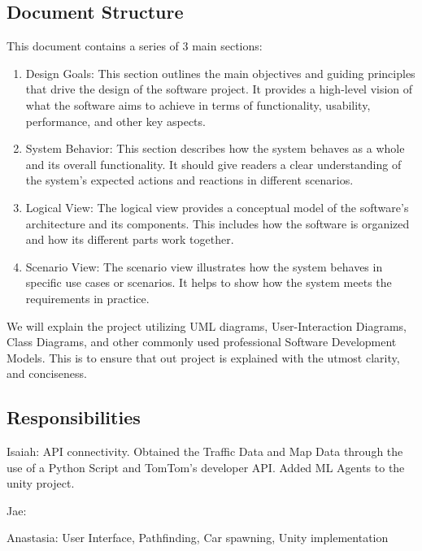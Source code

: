 \subsection{Document Structure}

This document contains a series of 3 main sections:
\begin{enumerate}
    \item Design Goals: This section outlines the main objectives and guiding principles that drive the design of the software project. 
    It provides a high-level vision of what the software aims to achieve in terms of functionality, usability, performance, and other key aspects.
    
    \item System Behavior: This section describes how the system behaves as a whole and its overall functionality. 
    It should give readers a clear understanding of the system's expected actions and reactions in different scenarios.
    
    \item Logical View: The logical view provides a conceptual model of the software's architecture and its components. 
    This includes how the software is organized and how its different parts work together.

    \item Scenario View: The scenario view illustrates how the system behaves in specific use cases or scenarios. 
    It helps to show how the system meets the requirements in practice.
\end{enumerate}

We will explain the project utilizing UML diagrams, User-Interaction Diagrams, Class Diagrams, and other commonly used professional Software Development Models.
This is to ensure that out project is explained with the utmost clarity, and conciseness.

\subsection{Responsibilities}

Isaiah: API connectivity.
Obtained the Traffic Data and Map Data through the use of a Python Script and TomTom's developer API.
Added ML Agents to the unity project.

Jae: 

Anastasia: User Interface, Pathfinding, Car spawning, Unity implementation
